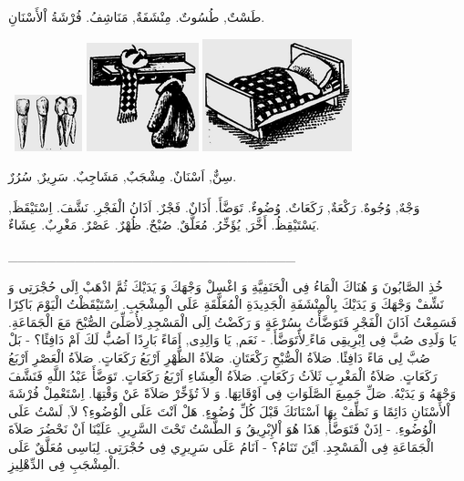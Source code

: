 \documentclass[a5paper]{article}
\begin{document}
طَسْتٌ, طُسُوتٌ. مِنْشَفَةٌ, مَنَاشِفُ. فُرْشَةُ اْلأَسْنَانِ. 

\  \includegraphics[width=0.7709in,height=0.6457in]{images/MuhammadBagauddinprettified-img210.png}   \includegraphics[width=1.2811in,height=1.2398in]{images/MuhammadBagauddinprettified-img211.png}   \includegraphics[width=1.7083in,height=1.2811in]{images/MuhammadBagauddinprettified-img212.png} 

سِنٌّ, اَسْنَانٌ. مِشْجَبٌ, مَشَاجِبٌ. سَرِيرٌ, سُرُرٌ. 

وَجْهٌ, وُجُوهٌ. رَكْعَةٌ, رَكَعَاتٌ. وُضُوءٌ. تَوَضَّأَ. أَذَانٌ. فَجْرٌ. اَذَانُ الْفَجْرِ. نَشَّفَ. اِسْتَيْقَظَ, يَسْتَيْقِظُ. أَخَّرَ, يُؤَخِّرُ. مُعَلَّقٌ. صُبْحٌ. ظُهْرٌ. عَصْرٌ. مَغْرِبٌ. عِشَاءٌ.

\_\_\_\_\_\_\_\_\_\_\_\_\_\_\_\_\_\_\_\_\_\_\_\_\_\_\_\_\_\_

خُذِ الصَّابُونَ وَ هُنَاكَ الْمَاءُ فِى الْحَنَفِيَّةِ وَ اغْسِلْ وَجْهَكَ وَ يَدَيْكَ ثُمَّ اذْهَبْ اِلَى حُجْرَتِى وَ نَشِّفْ وَجْهَكَ وَ يَدَيْكَ بِالْمِنْشَفَةِ الْجَدِيدَةِ الْمُعَلَّقَةِ عَلَى الْمِشْجَبِ. اِسْتَيْقَظْتُ الْيَوْمَ بَاكِرًا فَسَمِعْتُ اَذَانَ الْفَجْرِ فَتَوَضَّأْتُ بِسُرْعَةٍ وَ رَكَضْتُ اِلَى الْمَسْجِدِ ِلأُصَلِّىَ الصُّبْحَ مَعَ الْجَمَاعَةِ. يَا وَلَدِى صُبَّ فِى اِبْرِيقِى مَاءً ِلأَتَوَضَّأَ. - نَعَم, يَا وَالِدِى, اَمَاءً بَارِدًا اَصُبُّ لَكَ اَمْ دَافِئًا؟ - بَلْ صُبَّ لِى مَاءً دَافِئًا. صَلاَةُ الْصُّبْحِ رَكْعَتَانِ. صَلاَةُ الظُّهْرِ اَرْبَعُ رَكَعَاتٍ. صَلاَةُ الْعَصْرِ اَرْبَعُ رَكَعَاتٍ. صَلاَةُ الْمَغْرِبِ ثَلاَثُ رَكَعَاتٍ. صَلاَةُ الْعِشَاءِ اَرْبَعُ رَكَعَاتٍ. تَوَضَّأَ عَبْدُ اللَّهِ فَنَشَّفَ وَجْهَهُ وَ يَدَيْهُ. صَلِّ جَمِيعَ الصَّلَوَاتِ فِى اَوْقَاتِهَا. وَ لاَ تُؤَخِّرْ صَلاَةً عَنْ وَقْتِهَا. اِسْتَعْمِلْ فُرْشَةَ اْلأَسْنَانِ دَائِمًا وَ نَظِّفْ بِهَا اَسْنَانَكَ قَبْلَ كُلِّ وُضُوءٍ. هَلْ اَنْتَ عَلَى الْوُضُوءِ؟ لاَ, لَسْتُ عَلَى الْوُضُوءِ. - اِذَنْ فَتَوَضَّأْ, هَذَا هُوَ اْلإِبْرِيقُ وَ الطَّسْتُ تَحْتَ السَّرِيرِ, عَلَيْنَا اَنْ نَحْضُرَ صَلاَةَ الْجَمَاعَةِ فِى الْمَسْجِدِ. اَيْنَ تَنَامُ؟ - اَنَامُ عَلَى سَرِيرِي فِى حُجْرَتِى. لِبَاسِى مُعَلَّقٌ عَلَى الْمِشْجَبِ فِى الدِّهْلِيزِ.
\end{document}
